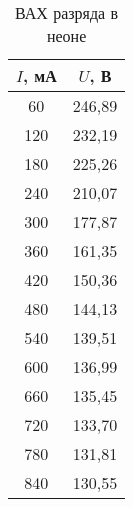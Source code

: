 \begin{table}[h!]
    \centering
    \begin{tabular}{|c|c|}
        \hline
        $I$, мА & $U$, В   \\ \hline
        60      & 246,89   \\ \hline
        120     & 232,19   \\ \hline
        180     & 225,26   \\ \hline
        240     & 210,07   \\ \hline
        300     & 177,87   \\ \hline
        360     & 161,35   \\ \hline
        420     & 150,36   \\ \hline
        480     & 144,13   \\ \hline
        540     & 139,51   \\ \hline
        600     & 136,99   \\ \hline
        660     & 135,45   \\ \hline
        720     & 133,70   \\ \hline
        780     & 131,81   \\ \hline
        840     & 130,55   \\ \hline
    \end{tabular}
    \caption{ВАХ разряда в неоне}
    \label{VAC1}
\end{table}